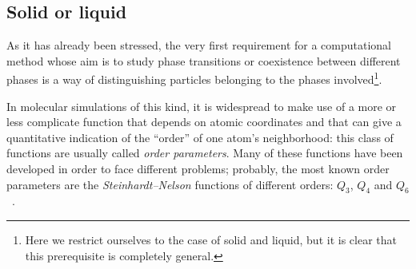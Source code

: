 \subsection{Solid or liquid}
As it has already been stressed, the very first requirement for a computational method whose aim is to study phase transitions or coexistence between different phases is a way of distinguishing particles belonging to the phases involved\footnote{Here we restrict ourselves to the case of solid and liquid, but it is clear that this prerequisite is completely general.}.

In molecular simulations of this kind, it is widespread to make use of a more or less complicate function that depends on atomic coordinates and that can give a quantitative indication of the ``order'' of one atom's neighborhood: this class of functions are usually called \emph{order parameters}. Many of these functions have been developed in order to face different problems; probably, the most known order parameters are the \textit{Steinhardt--Nelson} functions of different orders: $Q_3$, $Q_4$ and $Q_6$~\cite{Steinhardt1983}.

